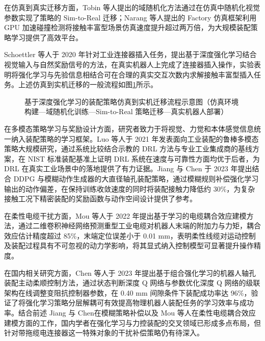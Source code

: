 在仿真到真实迁移方面，Tobin 等人\cite{Tobin2017}提出的域随机化方法通过在仿真中随机化视觉参数实现了策略的 Sim-to-Real 迁移；Narang 等人\cite{Narang2022}提出的 Factory 仿真框架利用 GPU 加速碰撞检测将接触丰富型场景仿真速度提升超过两万倍，为大规模装配策略学习提供了高效平台。

Schoettler 等人于 2020 年针对工业连接器插入任务，提出基于深度强化学习结合视觉输入与自然奖励信号的方法\cite{Schoettler2020}，在真实机器人上完成了连接器插入操作，实验表明将强化学习与先验信息相结合可在合理的真实交互次数内求解接触丰富型插入任务。上述仿真到实机迁移的一般流程如图\ref{fig:ch1:drl-assembly}所示。

\begin{figure}[htbp]
  \centering
  \caption{基于深度强化学习的装配策略仿真到实机迁移流程示意图（仿真环境构建—域随机化训练—Sim-to-Real 策略迁移—真实机器人部署）}
  \label{fig:ch1:drl-assembly}
\end{figure}

在多模态策略学习与奖励设计方面，研究者致力于将视觉、力觉和本体感觉信息统一纳入装配策略的学习框架。Luo 等人于 2021 年发表面向工业装配的鲁棒多模态策略大规模研究\cite{Luo2021}，通过系统比较结合示教的 DRL 方法与专业工业集成商的基线方案，在 NIST 标准装配基准上证明 DRL 系统在速度与可靠性方面均优于后者，为 DRL 在真实工业场景中的落地提供了有力证据。Jiang 与 Chen 于 2023 年提出结合 DDPG 与模糊动作生成器的大直径轴孔装配策略\cite{Jiang2023}，通过模糊规则补偿强化学习输出的动作偏差，在保持训练收敛速度的同时将装配接触力降低约 30\%，为复杂接触工况下精密装配的奖励函数与动作空间设计提供了参考。

在柔性电缆干扰方面，Mou 等人于 2022 年提出基于学习的电缆耦合效应建模方法\cite{Mou2022}，通过二维卷积神经网络预测重型工业电缆对机器人末端的附加力与力矩，耦合效应估计精度超过 85\%，末端定位误差小于 0.01 mm，表明柔性线缆对运动控制及装配过程具有不可忽视的动力学影响，将其显式纳入控制模型可显著提升操作精度。

在国内相关研究方面，Chen 等人于 2023 年提出基于组合强化学习的机器人轴孔装配主动柔顺控制方法\cite{Chen2023active}，通过状态判断深度 Q 网络与参数优化深度 Q 网络的级联架构在线调整变阻抗控制器参数，在 0.40 mm 间隙条件下装配成功率达 96\%，验证了将强化学习策略分层解耦可有效提高物理机器人装配任务的学习效率与成功率。结合前述 Jiang 与 Chen\cite{Jiang2023}在模糊策略补偿以及 Mou 等人\cite{Mou2022}在柔性电缆耦合效应建模方面的工作，国内学者在强化学习与力控装配的交叉领域已形成多点布局，但针对带拖缆电连接器这一特殊对象的干扰补偿策略仍有待深入。

